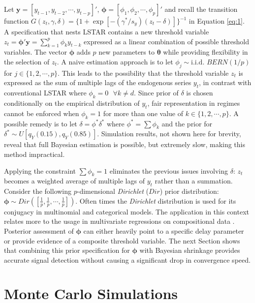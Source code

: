 Let $\bm{y}=[y_{t-1}, y_{t-2},\cdots,y_{t-p}]'$, $\bm{\phi}=[\phi_{1}, \phi_{2},\cdots,\phi_{p}]'$ and recall the transition function $G(z_t,\gamma,\delta)=\{1+\exp[-(\gamma^*/s_y)(z_t-\delta)]\}^{-1}$ in Equation \ref{eq:1}. A specification that nests LSTAR contains a new threshold variable $z_t=\bm{\phi}'\bm{y}=\sum\limits_{k=1}^p \phi_ky_{t-k}$ expressed as a linear combination of possible threshold variables. The vector $\bm{\phi}$ adds $p$ new parameters to $\bm{\theta}$  while providing flexibility in the selection of $z_t$. A naive estimation approach is to let $\phi_j \sim \textrm{i.i.d. } BERN(1/p)$ for $j \in \{1,2,\cdots,p\}$. This leads to the possibility that the threshold variable $z_t$ is expressed as the sum of multiple lags of the endogenous series $y_t$, in contrast with conventional LSTAR where $\phi_k=0 \textrm{ } \forall k\neq d$. Since prior of $\delta$ is chosen conditionally on the empirical distribution of $y_t$, fair representation in regimes cannot be enforced when $\phi_k=1$ for more than one value of $k \in \{1,2, \cdots, p\}$. A possible remedy is to let $\delta=\phi^*\delta^*$ where $\phi^*=\sum \phi_k$ and the prior for $\delta^* \sim U[q_Y(0.15),q_Y(0.85)]$. Simulation results, not shown here for brevity, reveal that full Bayesian estimation is possible, but extremely slow, making this method impractical. 

Applying the constraint $\sum \phi_k =1$ eliminates the previous issues involving $\delta$: $z_t$ becomes a weighted average of multiple lags of $y_t$ rather than a summation. Consider the following $p$-dimensional \textit{Dirichlet} ($Dir$) prior distribution: $\bm{\phi} \sim Dir([\frac{1}{p},\frac{1}{p},\cdots, \frac{1}{p}])$. Often times the \textit{Dirichlet} distribution is used for its conjugacy in multinomial and categorical models. The application in this context relates more to the usage in multivariate regressions on compositional data \citep{Campbell1987,Hijazi2009}. Posterior assessment of $\bm{\phi}$ can either heavily point to a specific delay parameter or provide evidence of a composite threshold variable. The next Section shows that combining this prior specification for $\bm{\phi}$ with Bayesian shrinkage provides accurate signal detection without causing a significant drop in convergence speed. 

\section{Monte Carlo Simulations}

